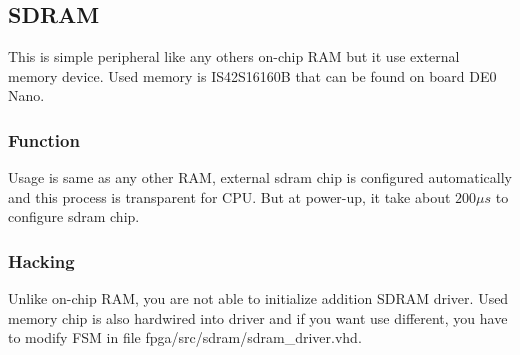 \subsection{SDRAM}

This is simple peripheral like any others on-chip RAM but it use 
external memory device. Used memory is IS42S16160B that can be found on 
board DE0 Nano.

\subsubsection{Function}

Usage is same as any other RAM, external sdram chip is configured 
automatically and this process is transparent for CPU. But at power-up, 
it take about $200 \mu s$ to configure sdram chip.

\subsubsection{Hacking}

Unlike on-chip RAM, you are not able to initialize addition SDRAM driver. 
Used memory chip is also hardwired into driver and if you want use 
different, you have to modify FSM in file 
fpga/src/sdram/sdram\_driver.vhd.
